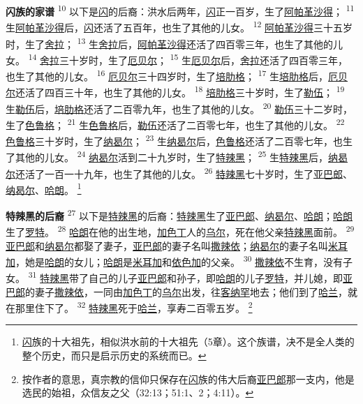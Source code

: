\textbf{闪族的家谱 }
\textsuperscript{10}
以下是\uline{闪}的后裔：洪水后两年，\uline{闪}正一百岁，生了\uline{阿帕革}\uline{沙得}；
\textsuperscript{11}
生\uline{阿帕革}\uline{沙得}后，\uline{闪}还活了五百年，也生了其他的儿女。
\textsuperscript{12}
\uline{阿帕革}\uline{沙得}三十五岁时，生了\uline{舍拉}；
\textsuperscript{13}
生\uline{舍拉}后，\uline{阿帕革}\uline{沙得}还活了四百零三年，也生了其他的儿女。
\textsuperscript{14}
\uline{舍拉}三十岁时，生了\uline{厄贝尔}；
\textsuperscript{15}
生\uline{厄贝尔}后，\uline{舍拉}还活了四百零三年，也生了其他的儿女。
\textsuperscript{16}
\uline{厄贝尔}三十四岁时，生了\uline{培肋格}；
\textsuperscript{17}
生\uline{培肋格}后，\uline{厄贝尔}还活了四百三十年，也生了其他的儿女。
\textsuperscript{18}
\uline{培肋格}三十岁时，生了\uline{勒伍}；
\textsuperscript{19}
生\uline{勒伍}后，\uline{培肋格}还活了二百零九年，也生了其他的儿女。
\textsuperscript{20}
\uline{勒伍}三十二岁时，生了\uline{色鲁格}；
\textsuperscript{21}
生\uline{色鲁格}后，\uline{勒伍}还活了二百零七年，也生了其他的儿女。
\textsuperscript{22}
\uline{色鲁格}三十岁时，生了\uline{纳曷尔}；
\textsuperscript{23}
生\uline{纳曷尔}后，\uline{色鲁格}还活了二百零七年，也生了其他的儿女。
\textsuperscript{24}
\uline{纳曷尔}活到二十九岁时，生了\uline{特辣黑}；
\textsuperscript{25}
生\uline{特辣黑}后，\uline{纳曷尔}还活了一百一十九年，也生了其他的儿女。
\textsuperscript{26}
\uline{特辣黑}七十岁时，生了\uline{亚巴郎}、\uline{纳曷尔}、\uline{哈朗}。
\footnote{\uline{闪}族的十大祖先，相似洪水前的十大祖先（5章）。这个族谱，决不是全人类的整个历史，而只是启示历史的系统而已。}

\textbf{特辣黑的后裔 }
\textsuperscript{27}
以下是\uline{特辣黑}的后裔：\uline{特辣黑}生了\uline{亚巴郎}、\uline{纳曷尔}、\uline{哈朗}；\uline{哈朗}生了\uline{罗特}。
\textsuperscript{28}
\uline{哈朗}在他的出生地，\uline{加色丁}人的\uline{乌尔}，死在他父亲\uline{特辣黑}面前。
\textsuperscript{29}
\uline{亚巴郎}和\uline{纳曷尔}都娶了妻子，\uline{亚巴郎}的妻子名叫\uline{撒辣依}；\uline{纳曷尔}的妻子名叫\uline{米耳加}，她是\uline{哈朗}的女儿；\uline{哈朗}是\uline{米耳加}和\uline{依色加}的父亲。
\textsuperscript{30}
\uline{撒辣依}不生育，没有子女。
\textsuperscript{31}
\uline{特辣黑}带了自己的儿子\uline{亚巴郎}和孙子，即\uline{哈朗}的儿子\uline{罗特}，并儿媳，即\uline{亚巴郎}的妻子\uline{撒辣依}，一同由\uline{加色丁}的\uline{乌尔}出发，往\uline{客纳罕}地去；他们到了\uline{哈兰}，就在那里住下了。
\textsuperscript{32}
\uline{特辣黑}死于\uline{哈兰}，享寿二百零五岁。
\footnote{按作者的意思，真宗教的信仰只保存在\uline{闪}族的伟大后裔\uline{亚巴郎}那一支内，他是选民的始祖，众信友之父（32:13；51:1、2；4:11）。}

